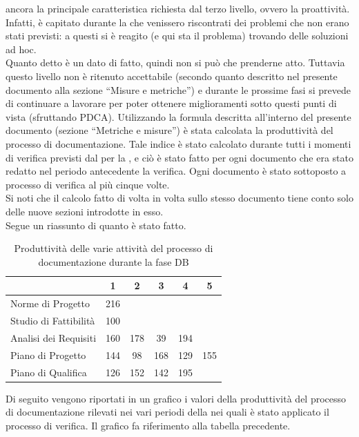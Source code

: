 				ancora la principale caratteristica richiesta dal terzo livello, ovvero la proattività. Infatti, è capitato durante la  che 
				venissero riscontrati dei problemi che non erano stati previsti: a questi si è reagito (e qui sta il problema) trovando delle soluzioni 
				ad hoc.\\
				Quanto detto è un dato di fatto, quindi non si può che prenderne atto. Tuttavia questo livello non è ritenuto accettabile (secondo quanto 
				descritto nel presente documento alla sezione “Misure e metriche”) e durante le prossime fasi si prevede di continuare a lavorare per 
				poter ottenere miglioramenti sotto questi punti di vista (sfruttando PDCA).
				Utilizzando la formula descritta all'interno del presente documento (sezione “Metriche e misure”) è stata calcolata la produttività del 
				processo di documentazione. Tale indice è stato calcolato durante tutti i momenti di verifica previsti dal  per 
				la , e ciò è stato fatto per ogni documento che era stato redatto nel periodo antecedente la verifica. Ogni documento è stato 
				sottoposto a processo di verifica al più cinque volte.\\
				Si noti che il calcolo fatto di volta in volta sullo stesso documento tiene conto solo delle nuove sezioni introdotte in esso.\\
				Segue un riassunto di quanto è stato fatto.
				\begin{table}[H]
					\centering
					\begin{tabu}{| l | c | c | c | c | c |}
						\hline
							&1	&2	&3	&4	&5	\\ \hline
						Norme di Progetto	&216 &	&	&	& \\ \hline
						Studio di Fattibilità	&100	&	&	&	& \\ \hline
						Analisi dei Requisiti	&160	&178	&39	&194	& \\ \hline
						Piano di Progetto	&144	&98	&168	&129	&155 \\ \hline
						Piano di Qualifica	&126	&152	&142	&195	&\\ \hline
					\end{tabu}
					\caption{Produttività delle varie attività del processo di documentazione durante la fase DB}
				\end{table}
				Di seguito vengono riportati in un grafico i valori della produttività del processo di documentazione rilevati nei vari periodi della 
				 nei quali è stato applicato il processo di verifica. Il grafico fa riferimento alla tabella precedente.
